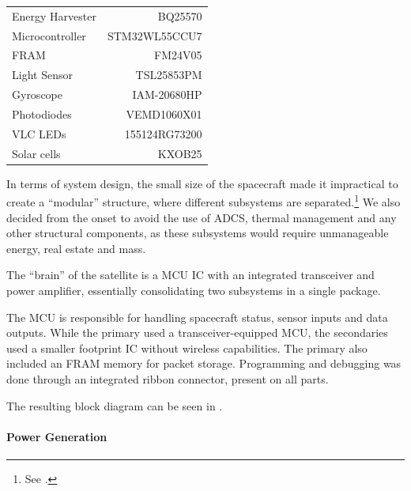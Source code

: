 \documentclass[a4paper,nobib,justified,final]{tufte-book}
\begin{document}
\begin{margintable}
	\caption{ChipSat-1 \acl{BOM}}
	\begin{tabular}{@{}lr@{}}
		\toprule
		Energy Harvester & BQ25570 \\
		Microcontroller & STM32WL55CCU7 \\
		\acs{FRAM} & FM24V05 \\
		Light Sensor & TSL25853PM \\
		Gyroscope & IAM-20680HP \\
		Photodiodes & VEMD1060X01 \\
		\acs{VLC} \acsp{LED} & 155124RG73200 \\
		Solar cells & KXOB25 \\
		\bottomrule
	\end{tabular}
\end{margintable}


In terms of system design, the small size of the spacecraft made it impractical to create a ``modular'' structure, where different subsystems are separated.\footnote{See .} We also decided from the onset to avoid the use of \acs{ADCS}, thermal management and any other structural components, as these subsystems would require unmanageable energy, real estate and mass.

The ``brain'' of the satellite is a \acf{MCU} \ac{IC} with an integrated transceiver and power amplifier, essentially consolidating two subsystems in a single package.

The \ac{MCU} is responsible for handling spacecraft status, sensor inputs and data outputs. While the primary used a transceiver-equipped \ac{MCU}, the secondaries used a smaller footprint \ac{IC} without wireless capabilities. The primary also included an \acs{FRAM} memory for packet storage. Programming and debugging was done through an integrated ribbon connector, present on all parts.

The resulting block diagram can be seen in .

\paragraph{Power Generation}
\end{document}
